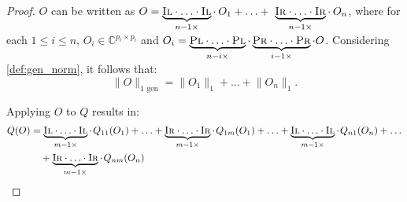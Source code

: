   \begin{proof}
    $O$ can be written as  $O = \underbrace{\textsc{Il} \cdot \ldots \cdot \textsc{Il}}_{n-1 \times} \cdot \hspace{2pt} O_{1} + \ldots +  \underbrace{\textsc{Ir} \cdot \ldots \cdot \textsc{Ir}}_{n-1 \times} \cdot \hspace{2pt} O_{n} 
  $, where for each $1 \leq i \leq n$, $O_{i} \in \mathbb{C}^{p_i \times p_i}$ and $O_i =  \underbrace{\textsc{Pl} \cdot \ldots \cdot \textsc{Pl}}_{n-i \times} \cdot \underbrace{\textsc{Pr} \cdot \ldots \cdot \textsc{Pr}}_{i-1 \times} \cdot O $. Considering \autoref{def:gen_norm}, it follows that: 
  \begin{equation}
    \lVert O  \rVert_{1 \text{ gen}} = \lVert O_1 \rVert_{1} + \ldots + \lVert O_n \rVert_{1}.
  \end{equation}
  
  Applying $O$ to $Q$ results in:
  \begin{equation}
  \begin{split}
  Q(O) & = \underbrace{\textsc{Il} \cdot \ldots \cdot \textsc{Il}}_{m-1 \times} \cdot \hspace{1pt} Q_{11}  (O_{1}) + \ldots +   \underbrace{\textsc{Ir} \cdot \ldots \cdot \textsc{Ir}}_{m-1 \times}\cdot \hspace{1pt} Q_{1m} (O_{1}) + \ldots +  \underbrace{\textsc{Il} \cdot \ldots \cdot \textsc{Il}}_{m-1 \times} \cdot\hspace{1pt} Q_{n1} (O_{n}) +  \ldots \\
  & \hspace{10pt}  + \underbrace{\textsc{Ir} \cdot \ldots \cdot \textsc{Ir}}_{m-1 \times}\cdot \hspace{1pt} Q_{nm}  (O_{n})
  \end{split}
  \end{equation}
  

\end{proof}
